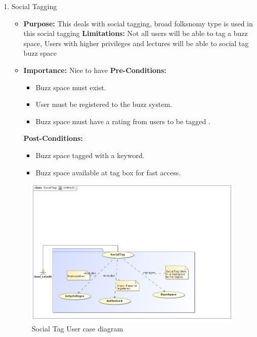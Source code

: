 \documentclass[11pt]{article}
\begin{document}
\begin{enumerate}
				















\item Social Tagging 
\begin{itemize}
\item \textbf{Purpose:}
This deals with social tagging, broad folksnomy type is used
in this social tagging
\newline
\textbf{Limitations:} 
Not all users will be able to tag a buzz
space, Users with higher privileges and lectures will be able to social
tag buzz space

\item \textbf{Importance:} Nice to have\newline
\textbf{Pre-Conditions: }
	\begin{itemize}
	\item Buzz space must exist.
	\item User must be registered to the buzz system.
	\item Buzz space must have a rating from users to be tagged .
	\end{itemize}

\textbf{Post-Conditions: }
	\begin{itemize}
	\item Buzz space tagged with a keyword.
	\item Buzz space available at tag box for fast access.
	\end{itemize}
\end{itemize}

\begin{figure}[H]	
\graphicspath{ {../Diagrams/sfiso/} }
    	\includegraphics[scale=0.5]{socialtag.jpg}
    	\caption{Social Tag User case diagram}
	\end{figure}


\end{enumerate}
\end{document}
